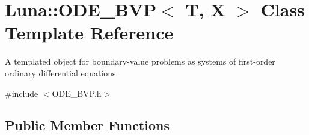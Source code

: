 \hypertarget{classLuna_1_1ODE__BVP}{}\section{Luna\+:\+:O\+D\+E\+\_\+\+B\+VP$<$ T, X $>$ Class Template Reference}
\label{classLuna_1_1ODE__BVP}


A templated object for boundary-\/value problems as systems of first-\/order ordinary differential equations.  




{\ttfamily \#include $<$O\+D\+E\+\_\+\+B\+V\+P.\+h$>$}

\subsection*{Public Member Functions}
